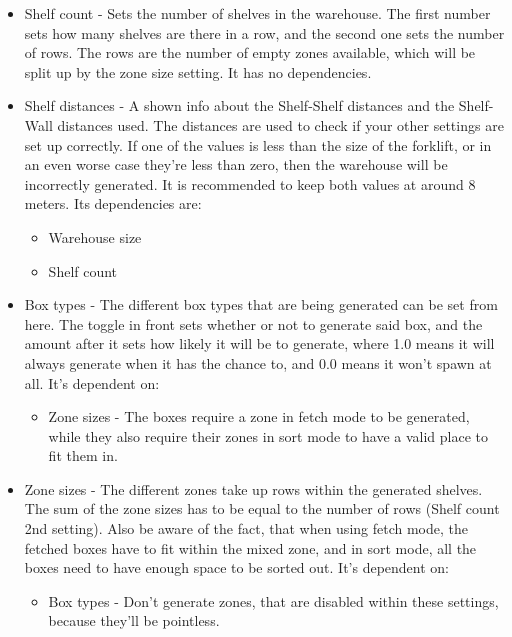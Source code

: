 \documentclass{article}
\begin{document}
\begin{itemize}
    \item Shelf count - Sets the number of shelves in the warehouse. The first number sets how many
    shelves are there in a row, and the second one sets the number of rows. The rows are 
    the number of empty zones available, which will be split up by the zone size setting. It has no
    dependencies.
    \item Shelf distances - A shown info about the Shelf-Shelf distances and the Shelf-Wall distances
    used. The distances are used to check if your other settings are set up correctly.
    If one of the values is less than the size of the forklift, or in an even worse case they're 
    less than zero, then the warehouse will be incorrectly generated. It is recommended to keep both
    values at around 8 meters. Its dependencies are:
    \begin{itemize}
        \item Warehouse size
        \item Shelf count
    \end{itemize}
    \item Box types - The different box types that are being generated can be set from here. The toggle
    in front sets whether or not to generate said box, and the amount after it sets how likely it will be
    to generate, where 1.0 means it will always generate when it has the chance to, and 0.0 means it won't
    spawn at all. It's dependent on:
    \begin{itemize}
        \item Zone sizes - The boxes require a zone in fetch mode to be generated, while they also require
        their zones in sort mode to have a valid place to fit them in.
    \end{itemize}
    \item Zone sizes - The different zones take up rows within the generated shelves. The sum of the zone
    sizes has to be equal to the number of rows (Shelf count 2nd setting). Also be aware of the fact, that
    when using fetch mode, the fetched boxes have to fit within the mixed zone, and in sort mode, all the
    boxes need to have enough space to be sorted out. It's dependent on:
    \begin{itemize}
        \item Box types - Don't generate zones, that are disabled within these settings, because they'll be
        pointless.
    \end{itemize}
\end{itemize}
\end{document}
